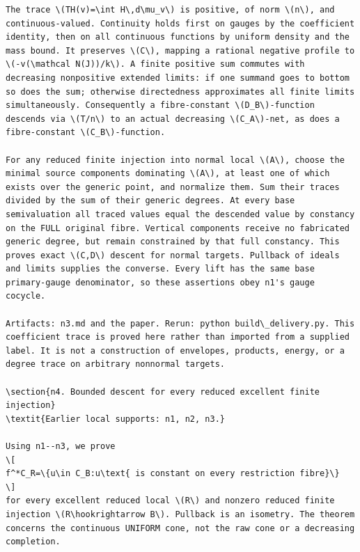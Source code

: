 \documentclass[11pt]{article}
\begin{document}
\begin{Verbatim}[fontsize=\tiny,breaklines=true,breakanywhere=true]
The trace \(TH(v)=\int H\,d\mu_v\) is positive, of norm \(n\), and continuous-valued. Continuity holds first on gauges by the coefficient identity, then on all continuous functions by uniform density and the mass bound. It preserves \(C\), mapping a rational negative profile to \(-v(\mathcal N(J))/k\). A finite positive sum commutes with decreasing nonpositive extended limits: if one summand goes to bottom so does the sum; otherwise directedness approximates all finite limits simultaneously. Consequently a fibre-constant \(D_B\)-function descends via \(T/n\) to an actual decreasing \(C_A\)-net, as does a fibre-constant \(C_B\)-function.

For any reduced finite injection into normal local \(A\), choose the minimal source components dominating \(A\), at least one of which exists over the generic point, and normalize them. Sum their traces divided by the sum of their generic degrees. At every base semivaluation all traced values equal the descended value by constancy on the FULL original fibre. Vertical components receive no fabricated generic degree, but remain constrained by that full constancy. This proves exact \(C,D\) descent for normal targets. Pullback of ideals and limits supplies the converse. Every lift has the same base primary-gauge denominator, so these assertions obey n1's gauge cocycle.

Artifacts: n3.md and the paper. Rerun: python build\_delivery.py. This coefficient trace is proved here rather than imported from a supplied label. It is not a construction of envelopes, products, energy, or a degree trace on arbitrary nonnormal targets.

\section{n4. Bounded descent for every reduced excellent finite injection}
\textit{Earlier local supports: n1, n2, n3.}

Using n1--n3, we prove
\[
f^*C_R=\{u\in C_B:u\text{ is constant on every restriction fibre}\}
\]
for every excellent reduced local \(R\) and nonzero reduced finite injection \(R\hookrightarrow B\). Pullback is an isometry. The theorem concerns the continuous UNIFORM cone, not the raw cone or a decreasing completion.


\end{Verbatim}
\end{document}
